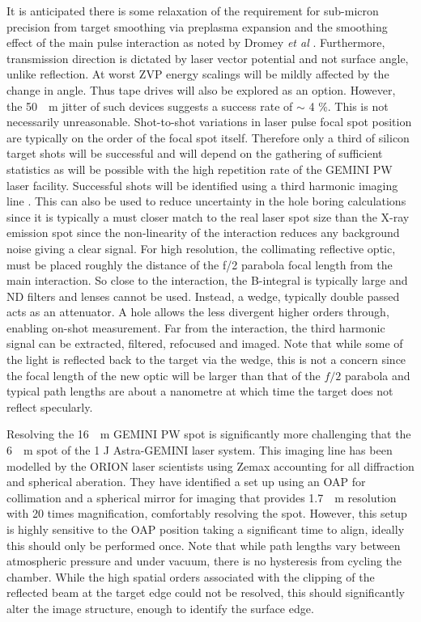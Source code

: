 It is anticipated there is some relaxation of the requirement for sub-micron precision from target smoothing via preplasma expansion and the smoothing effect of the main pulse interaction as noted by Dromey \textit{et al} \cite{dromeyDiffractionlimitedPerformanceFocusing2009}. Furthermore, transmission direction is dictated by laser vector potential and not surface angle, unlike reflection. At worst ZVP energy scalings will be mildly affected by the change in angle. Thus tape drives will also be explored as an option. However, the \qty{50}{\mu m} jitter of such devices suggests a success rate of $\sim$ 4 \%. This is not necessarily unreasonable. Shot-to-shot variations in laser pulse focal spot position are typically on the order of the focal spot itself. Therefore only a third of silicon target shots will be successful and will depend on the gathering of sufficient statistics as will be possible with the high repetition rate of the GEMINI PW laser facility. Successful shots will be identified using a third harmonic imaging line \cite{dromeyThirdHarmonicOrder2009}. This can also be used to reduce uncertainty in the hole boring calculations since it is typically a must closer match to the real laser spot size than the X-ray emission spot since the non-linearity of the interaction reduces any background noise giving a clear signal. For high resolution, the collimating reflective optic, must be placed roughly the distance of the f/2 parabola focal length from the main interaction. So close to the interaction, the B-integral is typically large and ND filters and lenses cannot be used. Instead, a wedge, typically double passed acts as an attenuator. A hole allows the less divergent higher orders through, enabling on-shot measurement. Far from the interaction, the third harmonic signal can be extracted, filtered, refocused and imaged. Note that while some of the light is reflected back to the target via the wedge, this is not a concern since the focal length of the new optic will be larger than that of the $f/2$ parabola and typical path lengths are about a nanometre at which time the target does not reflect specularly. 

Resolving the \qty{16}{\mu m} GEMINI PW spot is significantly more challenging that the \qty{6}{\mu m} spot of the 1 J Astra-GEMINI laser system. This imaging line has been modelled by the ORION laser scientists using Zemax \cite{AnsysZemaxOpticStudio} accounting for all diffraction and spherical aberation. They have identified a set up using an \ac{OAP} for collimation and a spherical mirror for imaging that provides \qty{1.7}{\mu m} resolution with 20 times magnification, comfortably resolving the spot. However, this setup is highly sensitive to the \ac{OAP} position taking a significant time to align, ideally this should only be performed once. Note that while path lengths vary between atmospheric pressure and under vacuum, there is no hysteresis from cycling the chamber. While the high spatial orders associated with the clipping of the reflected beam at the target edge could not be resolved, this should significantly alter the image structure, enough to identify the surface edge. 


